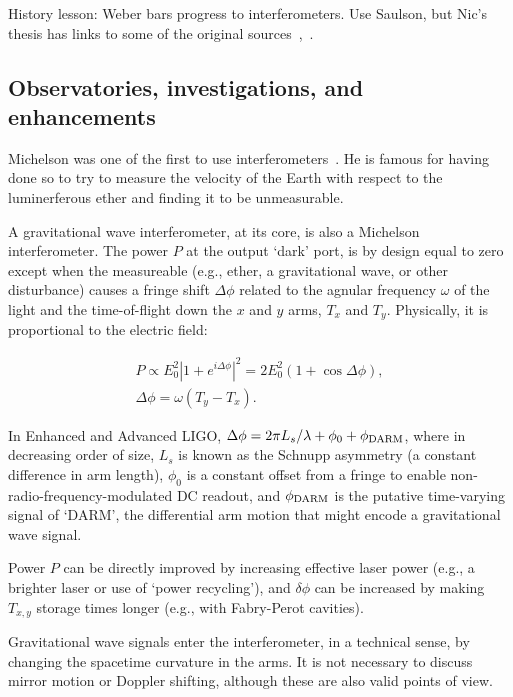             History lesson: Weber bars progress to interferometers. Use Saulson, but Nic's thesis has links to some of the original sources~\cite{Saulson},~\cite{SmithThesis}.           

        \subsection{Observatories, investigations, and enhancements}
        \label{methods}

		Michelson was one of the first to use interferometers~\cite{michelson}. He is famous for having done so to try to measure the velocity of the Earth with respect to the luminerferous ether and finding it to be unmeasurable.

A gravitational wave interferometer, at its core, is also a Michelson interferometer. 
The power $P$ at the output `dark' port, is by design equal to zero except when the measureable (e.g., ether, a gravitational wave, or other disturbance) causes a fringe shift $\Delta \phi$ related to the agnular frequency $\omega$ of the light and the time-of-flight down the $x$ and $y$ arms, $T_x$ and $T_y$. 
Physically, it is proportional to the electric field: 

\begin{eqnarray}
P \propto E_0^2 \left| 1 + e^{i \Delta \phi}\right|^2 = 2 E_0^2 (1 + \cos \Delta \phi), \\
\Delta \phi = \omega (T_y - T_x).
\end{eqnarray}

In Enhanced and Advanced LIGO, $\Delta \phi = 2\pi L_s /\lambda + \phi_0 + \phi_{\textup{DARM}} $, where in decreasing order of size, $L_s$ is known as the Schnupp asymmetry (a constant difference in arm length), $\phi_0$ is a constant offset from a fringe to enable non-radio-frequency-modulated DC readout, and $\phi_{\textup{DARM}}$ is the putative time-varying signal of `DARM', the differential arm motion that might encode a gravitational wave signal. 

Power $P$ can be directly improved by increasing effective laser power (e.g., a brighter laser or use of `power recycling'), and $\delta \phi$ can be increased by making $T_{x,y}$ storage times longer (e.g., with Fabry-Perot cavities).

Gravitational wave signals enter the interferometer, in a technical sense, by changing the spacetime curvature in the arms. It is not necessary to discuss mirror motion or Doppler shifting, although these are also valid points of view. 


